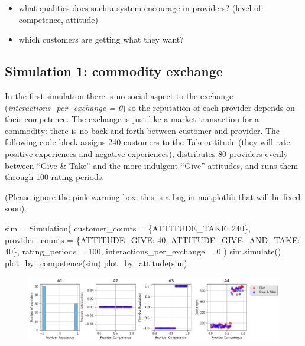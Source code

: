 \documentclass[
  letterpaper,
  DIV=11,
  numbers=noendperiod]{scrartcl}
\newenvironment{Shaded}{\begin{snugshade}}{\end{snugshade}}
\newcommand{\DecValTok}[1]{\textcolor[rgb]{0.68,0.00,0.00}{#1}}
\newcommand{\NormalTok}[1]{\textcolor[rgb]{0.00,0.23,0.31}{#1}}
\newcommand{\OperatorTok}[1]{\textcolor[rgb]{0.37,0.37,0.37}{#1}}
\providecommand{\tightlist}{%
  \setlength{\itemsep}{0pt}\setlength{\parskip}{0pt}}\usepackage{longtable,booktabs,array}
\begin{document}
\begin{itemize}
\tightlist
\item
  what qualities does such a system encourage in providers? (level of
  competence, attitude)
\item
  which customers are getting what they want?
\end{itemize}

\hypertarget{simulation-1-commodity-exchange}{%
\subsection{Simulation 1: commodity
exchange}\label{simulation-1-commodity-exchange}}

In the first simulation there is no social aspect to the exchange
(\emph{interactions\_per\_exchange = 0}) so the reputation of each
provider depends on their competence. The exchange is just like a market
transaction for a commodity: there is no back and forth between customer
and provider. The following code block assigns 240 customers to the Take
attitude (they will rate positive experiences and negative experiences),
distributes 80 providers evenly between ``Give \& Take'' and the more
indulgent ``Give'' attitudes, and runs them through 100 rating periods.

(Please ignore the pink warning box: this is a bug in matplotlib that
will be fixed soon).

\begin{Shaded}
\begin{Highlighting}[]
\NormalTok{sim }\OperatorTok{=}\NormalTok{ Simulation(}
\NormalTok{    customer\_counts }\OperatorTok{=}\NormalTok{ \{ATTITUDE\_TAKE: }\DecValTok{240}\NormalTok{\},}
\NormalTok{    provider\_counts }\OperatorTok{=}\NormalTok{ \{ATTITUDE\_GIVE: }\DecValTok{40}\NormalTok{, ATTITUDE\_GIVE\_AND\_TAKE: }\DecValTok{40}\NormalTok{\},}
\NormalTok{    rating\_periods }\OperatorTok{=} \DecValTok{100}\NormalTok{,}
\NormalTok{    interactions\_per\_exchange }\OperatorTok{=} \DecValTok{0}
\NormalTok{    )}
\NormalTok{sim.simulate()}
\NormalTok{plot\_by\_competence(sim)}
\NormalTok{plot\_by\_attitude(sim)}
\end{Highlighting}
\end{Shaded}

\begin{figure}[H]

{\centering \includegraphics{provider-reputation_files/figure-pdf/cell-11-output-1.png}

}

\end{figure}
\end{document}

